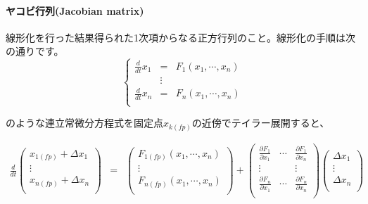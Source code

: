 \paragraph{ヤコビ行列(Jacobian matrix)}
線形化を行った結果得られた1次項からなる正方行列のこと。線形化の手順は次の通りです。
\[
\left\{
\begin{array}{lclclll}
\displaystyle\frac{d}{dt}x_1 & = & F_1(x_1, \cdots , x_n)\\
                & \vdots & \\
\displaystyle\frac{d}{dt}x_n & = & F_n(x_1, \cdots , x_n)\\
\end{array}
\right.
\]

のような連立常微分方程式を固定点\(x_{k(fp)}\)の近傍でテイラー展開すると、

\[
\begin{array}{ccl}
\displaystyle\frac{d}{dt}
\left(
\begin{array}{c}
x_{1(fp)}+\Delta x_1\\
\vdots \\
x_{n(fp)}+\Delta x_n\\
\end{array}
\right)
& = &
\left(
\begin{array}{c}
F_{1(fp)}(x_1, \cdots , x_n)\\
\vdots \\
F_{n(fp)}(x_1, \cdots , x_n)\\
\end{array}
\right)

+

\left(
\begin{array}{ccc}
\frac{\partial F_1}{\partial x_1} & \cdots & \frac{\partial F_1}{\partial x_n} \\
\vdots                            &        & \vdots\\
\frac{\partial F_n}{\partial x_1} & \cdots & \frac{\partial F_n}{\partial x_n} \\
\end{array}
\right)
\left(
\begin{array}{c}
\Delta x_1\\
\vdots \\
\Delta x_n\\
\end{array}
\right)\\


\end{array}\]
